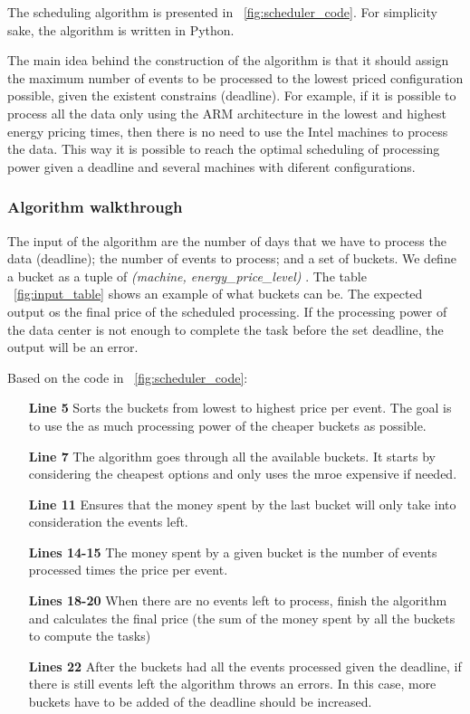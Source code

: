 The scheduling algorithm is presented in ~\ref{fig:scheduler_code}. For simplicity sake, the algorithm is written in Python.

The main idea behind the construction of the algorithm is that it should assign the maximum number of events to be processed to the lowest priced configuration possible, given the existent constrains (deadline). For example, if it is possible to process all the data only using the ARM architecture in the lowest and highest energy pricing times, then there is no need to use the Intel machines to process the data. This way it is possible to reach the optimal scheduling of processing power given a deadline and several machines with diferent configurations.

\subsubsection*{Algorithm walkthrough}
The input of the algorithm are the number of days that we have to process the data (deadline); the number of events to process; and a set of buckets. We define a bucket as a tuple of \textit{ (machine, energy\_price\_level) }. The table ~\ref{fig:input_table} shows an example of what buckets can be.
The expected output os the final price of the scheduled processing. If the processing power of the data center is not enough to complete the task before the set deadline, the output will be an error.


\vspace{10mm}
Based on the code in ~\ref{fig:scheduler_code}: 
\begin{itemize}
  \item[\textbf{Line 5}] Sorts the buckets from lowest to highest price per event. The goal is to use the as much processing power of the cheaper buckets as possible.
  
  \item[\textbf{Line 7}] The algorithm goes through all the available buckets. It starts by considering the cheapest options and only uses the mroe expensive if needed.
  
  \item[\textbf{Line 11}] Ensures that the money spent by the last bucket will only take into consideration the events left. 
  
  \item[\textbf{Lines 14-15}] The money spent by a given bucket is the number of events processed times the price per event.
  
  \item[\textbf{Lines 18-20}] When there are no events left to process, finish the algorithm and calculates the final price (the sum of the money spent by all the buckets to compute the tasks)
  
  \item[\textbf{Lines 22}] After the buckets had all the events processed given the deadline, if there is still events left the algorithm throws an errors. In this case, more buckets have to be added of the deadline should be increased.

  \end{itemize}


